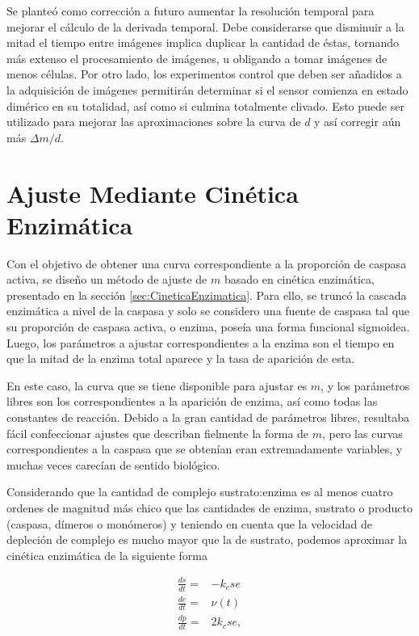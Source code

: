 Se planteó como corrección a futuro aumentar la resolución temporal para mejorar el cálculo de la derivada temporal. Debe considerarse que disminuir a la mitad el tiempo entre imágenes implica duplicar la cantidad de éstas, tornando más extenso el procesamiento de imágenes, u obligando a tomar imágenes de menos células. Por otro lado, los experimentos control que deben ser añadidos a la adquisición de imágenes permitirán determinar si el sensor comienza en estado dimérico en su totalidad, así como si culmina totalmente clivado. Esto puede ser utilizado para mejorar las aproximaciones sobre la curva de $d$ y así corregir aún más $\Delta m/d$.


\section{Ajuste Mediante Cinética Enzimática}

Con el objetivo de obtener una curva correspondiente a la proporción de caspasa activa, se diseño un método de ajuste de $m$ basado en cinética enzimática, presentado en la sección \ref{sec:CineticaEnzimatica}. Para ello, se truncó la cascada enzimática a nivel de la caspasa y solo se considero una fuente de caspasa tal que su proporción de caspasa activa, o enzima, poseía una forma funcional sigmoidea. Luego, los parámetros a ajustar correspondientes a la enzima son el tiempo en que la mitad de la enzima total aparece y la tasa de aparición de esta.

En este caso, la curva que se tiene disponible para ajustar es $m$, y los parámetros libres son los correspondientes a la aparición de enzima, así como todas las constantes de reacción. Debido a la gran cantidad de parámetros libres, resultaba fácil confeccionar ajustes que describan fielmente la forma de $m$, pero las curvas correspondientes a la caspasa que se obtenían eran extremadamente variables, y muchas veces carecían de sentido biológico.

Considerando que la cantidad de complejo sustrato:enzima es al menos cuatro ordenes de magnitud más chico que las cantidades de enzima, sustrato o producto (caspasa, dímeros o monómeros) y teniendo en cuenta que la velocidad de depleción de complejo es mucho mayor que la de sustrato, podemos aproximar la cinética enzimática de la siguiente forma

\begin{align}
    \frac{ds}{dt} =& - k_c se \label{eq:cin_sens}\\
    \frac{de}{dt} =& \nu(t)\\
    \frac{dp}{dt} =& 2 k_c se, \label{eq:cin_prod}\\
\end{align}

